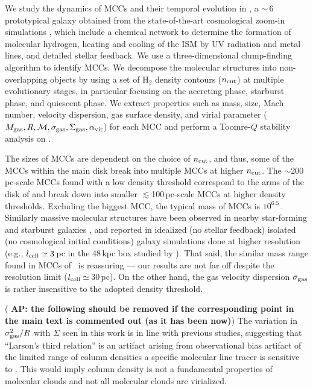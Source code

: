 \IfFileExists{emulateapjlegacy.cls}{\documentclass[iop]{emulateapjlegacy}}{\documentclass[iop]{emulateapj}}
\newcommand{\AP}[1]{({\bf \color{apcolor} AP: #1})}
\begin{document}
We study the dynamics of MCCs and their temporal evolution in \flower, a \z$\sim$\,6 prototypical galaxy obtained from the state-of-the-art cosmological zoom-in simulations , which include a chemical network to determine the formation of molecular hydrogen, heating and cooling of the ISM by UV radiation and metal lines, and detailed stellar feedback.
%
We use a three-dimensional clump-finding algorithm to identify MCCs. We decompose the molecular structures into non-overlapping objects by using a set of H$_2$ density contours ($n_{\rm cut}$) at multiple evolutionary stages, in particular focusing on the accreting phase, starburst phase, and quiescent phase. We extract properties such as mass, size, Mach number, velocity dispersion, gas surface density, and virial parameter ($M_{\rm gas}, R, \mathcal{M}, \sigma_{\rm gas}, \Sigma_{\rm gas}, \alpha_{\rm vir}$) for each MCC and perform a Toomre-$Q$ stability analysis on \flower.

The sizes of MCCs are dependent on the choice of $n_{\rm cut}$, and thus, some of the MCCs within the main disk break into multiple MCCs at higher $n_{\rm cut}$. The $\sim$200\,pc-scale MCCs found with a low density threshold correspond to the arms of the disk of \flower and break down into smaller $\lesssim$100\,pc-scale MCCs at higher density thresholds.
%
Excluding the biggest MCC, the typical mass of MCCs is $10^{6.5}$\,\Msun. Similarly massive molecular structures have been observed in nearby star-forming and starburst galaxies \citep[e.g.,][]{Keto05a, DonovanMeyer13a, Colombo14a, Leroy15a}, and reported in idealized (no stellar feedback) isolated (no cosmological initial conditions) galaxy simulations done at higher resolution (e.g., $l_{\rm cell}\simeq3$\,pc in the 48\,kpc box studied by \citealt{Behrendt16a}). That said, the similar mass range found in MCCs of \flower\ is reassuring --- our results are not far off despite the resolution limit ($l_{\rm cell}\simeq$\,30\,pc). On the other hand, the gas velocity dispersion $\sigma_{\rm gas}$ is rather insensitive to the adopted density threshold.


\AP{the following should be removed if the corresponding point in the main text is commented out (as it has been now)}
The variation in $\sigma_{\rm gas}^2/R$ with $\Sigma$ seen in this work is in line with previous studies, suggesting that ``Larson's third relation'' is an artifact arising from observational bias artifact of the limited range of  column densities a specific molecular line tracer is sensitive to \citep[][]{Ballesteros02a, Ballesteros11a}. This would imply column density is not a fundamental properties of molecular clouds and not all molecular clouds are virialized. 
\end{document}
